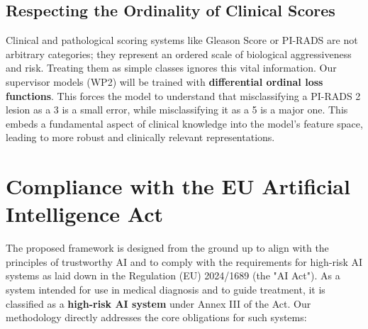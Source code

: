 \documentclass[11pt, a4paper]{article}
\begin{document}
\subsection{Respecting the Ordinality of Clinical Scores}
Clinical and pathological scoring systems like Gleason Score or PI-RADS are not arbitrary categories; they represent an ordered scale of biological aggressiveness and risk. Treating them as simple classes ignores this vital information. Our supervisor models (WP2) will be trained with \textbf{differential ordinal loss functions}. This forces the model to understand that misclassifying a PI-RADS 2 lesion as a 3 is a small error, while misclassifying it as a 5 is a major one. This embeds a fundamental aspect of clinical knowledge into the model's feature space, leading to more robust and clinically relevant representations.

\section{Compliance with the EU Artificial Intelligence Act}
The proposed framework is designed from the ground up to align with the principles of trustworthy AI and to comply with the requirements for high-risk AI systems as laid down in the Regulation (EU) 2024/1689 (the "AI Act"). As a system intended for use in medical diagnosis and to guide treatment, it is classified as a \textbf{high-risk AI system} under Annex III of the Act. Our methodology directly addresses the core obligations for such systems:
\end{document}
